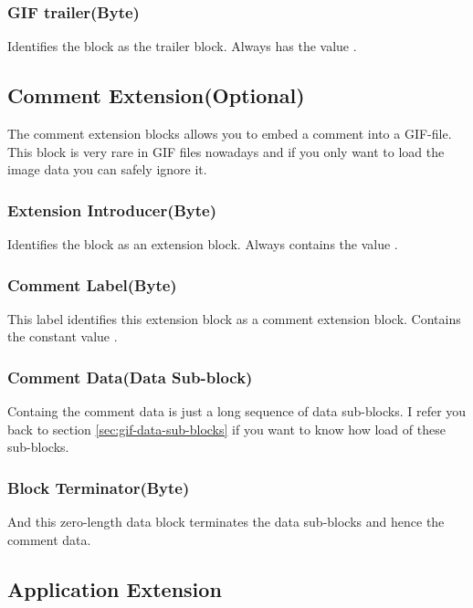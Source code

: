   \subsubsection{GIF trailer(Byte)}

  Identifies the block as the trailer block. Always has the value
  .

  \subsection{Comment Extension(Optional)}

  The comment extension blocks allows you to embed a comment into a
  GIF-file. This block is very rare in GIF files nowadays and if you
  only want to load the image data you can safely ignore it.

  \subsubsection{Extension Introducer(Byte)}

  Identifies the block as an extension block. Always contains the
  value .

  \subsubsection{Comment Label(Byte)}

  This label identifies this extension block as a comment extension
  block. Contains the constant value .

  \subsubsection{Comment Data(Data Sub-block)}

  Containg the comment data is just a long sequence of data
  sub-blocks. I refer you back to section \ref{sec:gif-data-sub-blocks} if
  you want to know how load of these sub-blocks.

  \subsubsection{Block Terminator(Byte)}

  And this zero-length data block terminates the data sub-blocks and hence
  the comment data.

  \subsection{Application Extension}

